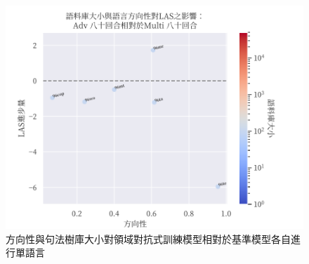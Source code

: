 \begin{figure}[h]
    \centering
    \includegraphics{figs/chapter4/adv_to_multi.pdf}
    \caption{方向性與句法樹庫大小對領域對抗式訓練模型相對於基準模型各自進行單語言}
    \label{fig:dir-size-las-ft-fomaml-to-multi}
\end{figure}